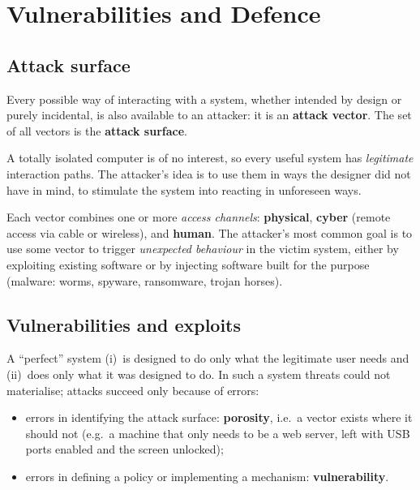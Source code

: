\section{Vulnerabilities and Defence}
\label{sec:vulnerabilities-defence}

\subsection{Attack surface}

\begin{definition}
Every possible way of interacting with a system, whether intended by design or purely incidental, is also available to an attacker: it is an \textbf{attack vector}. The set of all vectors is the \textbf{attack surface}.
\end{definition}

A totally isolated computer is of no interest, so every useful system has \emph{legitimate} interaction paths. The attacker's idea is to use them in ways the designer did not have in mind, to stimulate the system into reacting in unforeseen ways.

Each vector combines one or more \emph{access channels}: \textbf{physical}, \textbf{cyber} (remote access via cable or wireless), and \textbf{human}. The attacker's most common goal is to use some vector to trigger \emph{unexpected behaviour} in the victim system, either by exploiting existing software or by injecting software built for the purpose (malware: worms, spyware, ransomware, trojan horses).

\subsection{Vulnerabilities and exploits}

A \enquote{perfect} system (i)~is designed to do only what the legitimate user needs and (ii)~does only what it was designed to do. In such a system threats could not materialise; attacks succeed only because of errors:
\begin{itemize}
    \item errors in identifying the attack surface: \textbf{porosity}, i.e.\ a vector exists where it should not (e.g.\ a machine that only needs to be a web server, left with USB ports enabled and the screen unlocked);
    \item errors in defining a policy or implementing a mechanism: \textbf{vulnerability}.
\end{itemize}

